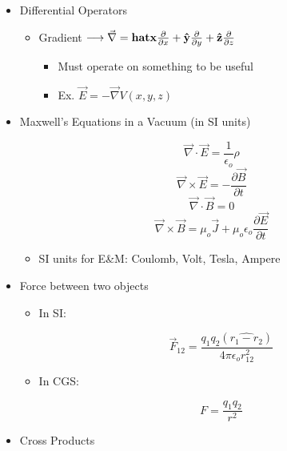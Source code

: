 \begin{itemize}
  \item Differential Operators

    \begin{itemize}

      \item Gradient $\longrightarrow \vec{\nabla}=\bold{hat{x}}\frac{\partial}{\partial x}+\bold{\hat{y}}\frac{\partial}{\partial y} + \bold{\hat{z}}\frac{\partial}{\partial z}$

        \begin{itemize}

          \item Must operate on something to be useful

          \item Ex. $\vec{E}=-\vec{\nabla}V(x,y,z)$

        \end{itemize}

    \end{itemize}

  \item Maxwell's Equations in a Vacuum (in SI units)

    $$\vec{\nabla}\cdot\vec{E}=\frac{1}{\epsilon_o}\rho$$
    $$\vec{\nabla}\times\vec{E}=-\frac{\partial\vec{B}}{\partial t}$$
    $$\vec{\nabla}\cdot\vec{B}=0$$
    $$\vec{\nabla}\times\vec{B}=\mu_o\vec{J}+\mu_o\epsilon_o\frac{\partial\vec{E}}{\partial t}$$

    \begin{itemize}

      \item SI units for E\&M: Coulomb, Volt, Tesla, Ampere

    \end{itemize}

  \item Force between two objects

    \begin{itemize}

      \item In SI:

        $$\vec{F}_{12}=\frac{q_1q_2(\widehat{r_1-r_2})}{4\pi\epsilon_o r_{12}^2}$$

      \item In CGS:

        $$F=\frac{q_1q_2}{r^2}$$

    \end{itemize}

  \item Cross Products


\end{itemize}
